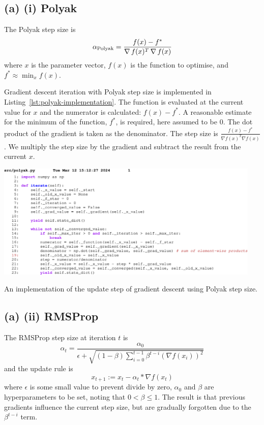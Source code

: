 \subsection{(a) (i) Polyak}

The Polyak step size is
\begin{equation}
  \alpha_{\text{Polyak}}=\frac{f(x)-f^*}{\operatorname*{\nabla} f(x)^T\operatorname*{\nabla} f(x)}
  \label{eq:polyak-step}
\end{equation}
where $x$ is the parameter vector, $f(x)$ is the function to optimise, and $f^*\approx\min_xf(x)$.

Gradient descent iteration with Polyak step size is implemented in Listing~\ref{lst:polyak-implementation}.
The function is evaluated at the current value for $x$ and the numerator is calculated: $f(x)-f^*$.
A reasonable estimate for the minimum of the function, $f^*$, is required, here assumed to be $0$.
The dot product of the gradient is taken as the denominator. The step size is $\frac{f(x)-f^*}{\nabla f(x)^T\nabla f(x)}$.
We multiply the step size by the gradient and subtract the result from the current $x$.
\begin{listing}
  \begin{center}
    \includegraphics[width=0.95\textwidth]{fig/polyak-code.pdf}
  \end{center}
  \caption{An implementation of the update step of gradient descent using Polyak step size.}\label{lst:polyak-implementation}
\end{listing}

\subsection{(a) (ii) RMSProp}

The RMSProp step size at iteration $t$ is
\begin{equation}
  \alpha_t=\frac{\alpha_0}{\epsilon +
  \sqrt{(1-\beta)\sum_{i=0}^{t-1}\beta^{t-i}(\nabla f(x_i))^2}}
\end{equation}
and the update rule is \begin{equation}
  x_{t+1}:=x_t-\alpha_t*\nabla f(x_t)
\end{equation}
where $\epsilon$ is some small value to prevent divide by zero, $\alpha_0$
and $\beta$ are hyperparameters to be set, noting that $0<\beta\le1$. The
result is that previous gradients influence the current step size, but are
gradually forgotten due to the $\beta^{t-i}$ term.

